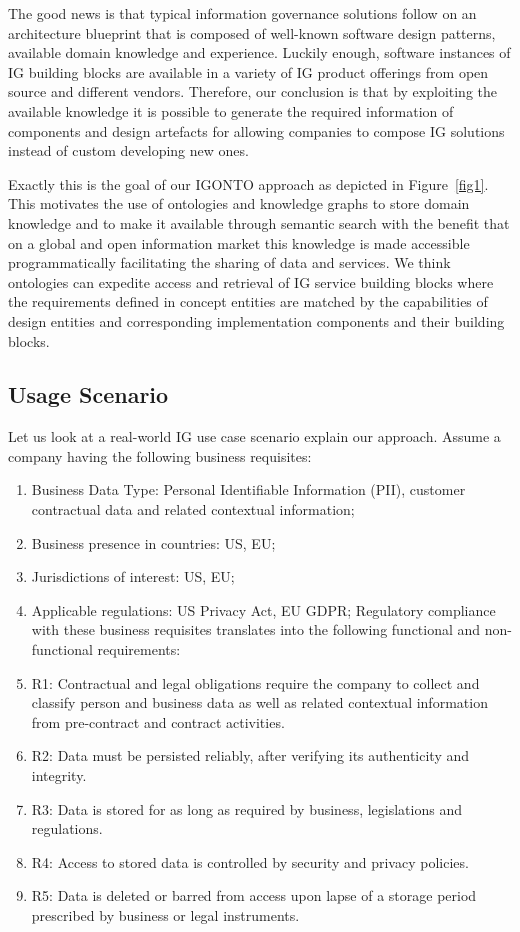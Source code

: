 \documentclass[runningheads]{llncs}
\begin{document}
The good news is that typical information governance solutions follow on an architecture blueprint that is composed of well-known software design patterns, available domain knowledge and experience. Luckily enough, software instances of IG building blocks are available in a variety of IG product offerings from open source and different vendors. Therefore, our conclusion is that by exploiting the available knowledge it is possible to generate the required information of components and design artefacts for allowing companies to compose IG solutions instead of custom developing new ones. 

Exactly this is the goal of our IGONTO approach as depicted in Figure~\ref{fig1}. This motivates the use of ontologies and knowledge graphs to store domain knowledge and to make it available through semantic search with the benefit that on a global and open information market this knowledge is made accessible programmatically facilitating the sharing of data and services. We think ontologies can expedite access and retrieval of IG service building blocks where the requirements defined in concept entities are matched by the capabilities of design entities and corresponding implementation components and their building blocks. 
\subsection{Usage Scenario}
Let us look at a real-world IG use case scenario explain our approach. 
Assume a company having the following business requisites:

\begin{enumerate}
    \item Business Data Type: Personal Identifiable Information (PII), customer contractual data and related contextual information; 
    \item Business presence in countries: US, EU; 
    \item Jurisdictions of interest: US, EU; 
    \item Applicable regulations: US Privacy Act, EU GDPR; 
Regulatory compliance with these business requisites translates into the following functional and non-functional requirements: 
    \item R1: Contractual and legal obligations require the company to collect and classify person and business data as well as related contextual information from pre-contract and contract activities. 
    \item R2: Data must be persisted reliably, after verifying its authenticity and integrity. 
    \item R3: Data is stored for as long as required by business, legislations and regulations.
    \item R4: Access to stored data is controlled by security and privacy policies. 
    \item R5: Data is deleted or barred from access upon lapse of a storage period prescribed by business or legal instruments. 
\end{enumerate}
\end{document}
